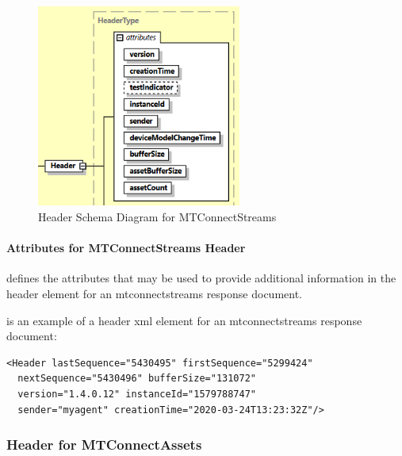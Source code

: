 \begin{figure}[ht]
  \centering
  \includegraphics[width=0.6\textwidth]{figures/header-schema-diagram-for-mtconnectstreams.png}
  \caption{Header Schema Diagram for MTConnectStreams}
  \label{fig:header-schema-diagram-for-mtconnectstreams}
\end{figure}

\FloatBarrier

\paragraph{Attributes for MTConnectStreams Header}\mbox{}

 defines the attributes that may be used to provide additional information in the \gls{header} element for an \gls{mtconnectstreams response document}.



 is an example of a \gls{header} \gls{xml} element for an \gls{mtconnectstreams response document}:

\begin{lstlisting}[firstnumber=1,escapechar=|,%
caption={Example of Header XML Element for MTConnectStreams}, label={lst:header-xml-element-for-mtconnectstreams}]
<Header lastSequence="5430495" firstSequence="5299424"
  nextSequence="5430496" bufferSize="131072"
  version="1.4.0.12" instanceId="1579788747"
  sender="myagent" creationTime="2020-03-24T13:23:32Z"/>
\end{lstlisting}

\subsubsection{Header for MTConnectAssets}

